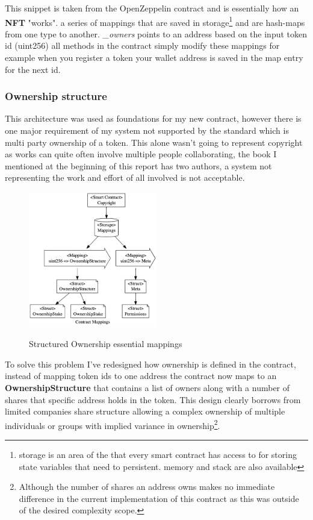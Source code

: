 This snippet is taken from the OpenZeppelin contract and is essentially how an \textbf{NFT} "works". a series of mappings that are saved in storage\footnote{storage is an area of the  that every smart contract has access to for storing state variables that need to persistent. memory and stack are also available} and are hash-maps from one type to another. \textit{\_owners} points to an address based on the input token id (uint256) all methods in the contract simply modify these mappings for example when you register a token your wallet address is saved in the map entry for the next id.

\subsubsection{Ownership structure}

This architecture was used as foundations for my new contract, however there is one major requirement of my system not supported by the \nft standard which is multi party ownership of a token. This alone wasn't going to represent copyright as works can quite often involve multiple people collaborating, the book I mentioned at the beginning of this report\cite{blockchain_revolution} has two authors, a system not representing the work and effort of all involved is not acceptable.

\begin{figure}[H]
\caption{Structured Ownership essential mappings}
\centering
\includegraphics[width=0.5\textwidth,height=0.5\textheight,keepaspectratio]{images/operational/mappings.png}
\label{fig:float}
\end{figure}

To solve this problem I've redesigned how ownership is defined in the contract, instead of mapping token ids to one address the contract now maps to an \textbf{OwnershipStructure} that contains a list of owners along with a number of shares that specific address holds in the token. This design clearly borrows from limited companies share structure allowing a complex ownership of multiple individuals or groups with implied variance in ownership\footnote{Although the number of shares an address owns makes no immediate difference in the current implementation of this contract as this was outside of the desired complexity scope.}.

